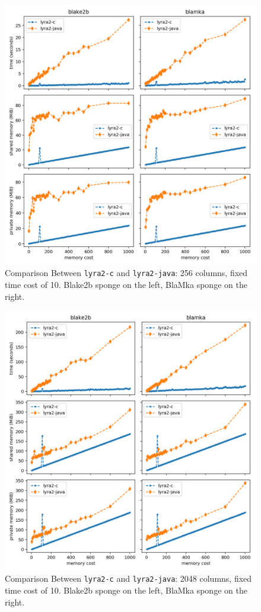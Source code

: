 \begin{figure}[H]
    \centering
    \includegraphics[width=\linewidth,keepaspectratio]{figures/mcost_256}
    \caption{Comparison Between \texttt{lyra2-c} and \texttt{lyra2-java}: 256 columns, fixed time cost of 10. Blake2b sponge on the left, BlaMka sponge on the right.}
    \label{figure:mcost_256}
\end{figure}

\begin{figure}[H]
    \centering
    \includegraphics[width=\linewidth,keepaspectratio]{figures/mcost_2048}
    \caption{Comparison Between \texttt{lyra2-c} and \texttt{lyra2-java}: 2048 columns, fixed time cost of 10. Blake2b sponge on the left, BlaMka sponge on the right.}
    \label{figure:mcost_2048}
\end{figure}

